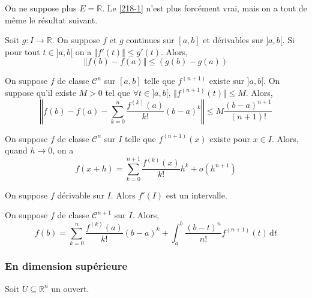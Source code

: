   On ne suppose plus $E = \mathbb{R}$. Le \cref{218-1} n'est plus forcément vrai, mais on a tout de même le résultat suivant.

  \begin{theorem}
    Soit $g : I \rightarrow \mathbb{R}$. On suppose $f$ et $g$ continues sur $[a,b]$ et dérivables sur $]a,b[$. Si pour tout $t \in ]a,b[$ on a $\Vert f'(t) \Vert \leq g'(t)$. Alors,
    \[ \Vert f(b) - f(a) \Vert \leq (g(b) - g(a)) \]
  \end{theorem}

  \begin{corollary}
    On suppose $f$ de classe $\mathcal{C}^n$ sur $[a,b]$ telle que $f^{(n+1)}$ existe sur $]a,b[$. On suppose qu'il existe $M > 0$ tel que $\forall t \in ]a,b[, \, \Vert f^{(n+1)}(t) \Vert \leq M$. Alors,
    \[ \left\Vert f(b) - f(a) - \sum_{k=0}^{n} \frac{f^{(k)}(a)}{k!}(b-a)^k \right\Vert \leq M \frac{(b-a)^{n+1}}{(n+1)!} \]
  \end{corollary}

  \begin{theorem}
    \label{218-2}
    On suppose $f$ de classe $\mathcal{C}^n$ sur $I$ telle que $f^{(n+1)}(x)$ existe pour $x \in I$. Alors, quand $h \longrightarrow 0$, on a
    \[ f(x+h) = \sum_{k=0}^{n+1} \frac{f^{(k)} (x)}{k!} h^k + o(h^{n+1}) \]
  \end{theorem}


  \begin{application}
    On suppose $f$ dérivable sur $I$. Alors $f'(I)$ est un intervalle.
  \end{application}


  \begin{theorem}
    On suppose $f$ de classe $\mathcal{C}^{n+1}$ sur $I$. Alors,
    \[ f(b) = \sum_{k=0}^{n} \frac{f^{(k)} (a)}{k!} (b-a)^k + \int_a^b \frac{(b-t)^n}{n!} f^{(n+1)}(t) \, \mathrm{d}t \]
  \end{theorem}

  \subsubsection{En dimension supérieure}


  Soit $U \subseteq \mathbb{R}^n$ un ouvert.

